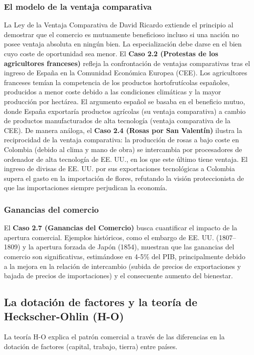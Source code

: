 \subsubsection{El modelo de la ventaja comparativa}
La Ley de la Ventaja Comparativa de David Ricardo extiende el principio al demostrar que el comercio es mutuamente beneficioso incluso si una nación no posee ventaja absoluta en ningún bien. La especialización debe darse en el bien cuyo coste de oportunidad sea menor. El \textbf{Caso 2.2 (Protestas de los agricultores franceses)} refleja la confrontación de ventajas comparativas tras el ingreso de España en la Comunidad Económica Europea (CEE). Los agricultores franceses temían la competencia de los productos hortofrutícolas españoles, producidos a menor coste debido a las condiciones climáticas y la mayor producción por hectárea. El argumento español se basaba en el beneficio mutuo, donde España exportaría productos agrícolas (su ventaja comparativa) a cambio de productos manufacturados de alta tecnología (ventaja comparativa de la CEE). De manera análoga, el \textbf{Caso 2.4 (Rosas por San Valentín)} ilustra la reciprocidad de la ventaja comparativa: la producción de rosas a bajo coste en Colombia (debido al clima y mano de obra) se intercambia por procesadores de ordenador de alta tecnología de EE. UU., en los que este último tiene ventaja. El ingreso de divisas de EE. UU. por sus exportaciones tecnológicas a Colombia supera el gasto en la importación de flores, refutando la visión proteccionista de que las importaciones siempre perjudican la economía.

\subsubsection{Ganancias del comercio}
El \textbf{Caso 2.7 (Ganancias del Comercio)} busca cuantificar el impacto de la apertura comercial. Ejemplos históricos, como el embargo de EE. UU. (1807–1809) y la apertura forzada de Japón (1854), muestran que las ganancias del comercio son significativas, estimándose en 4-5\% del PIB, principalmente debido a la mejora en la relación de intercambio (subida de precios de exportaciones y bajada de precios de importaciones) y el consecuente aumento del bienestar.

\subsection{La dotación de factores y la teoría de Heckscher-Ohlin (H-O)}
La teoría H-O explica el patrón comercial a través de las diferencias en la dotación de factores (capital, trabajo, tierra) entre países.

